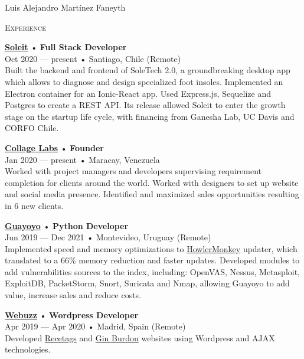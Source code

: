 \documentclass[12pt]{article}
\begin{document}
\begin{cv}{Luis Alejandro Mart\'inez Faneyth}
\begin{minipage}[t]{0.55\textwidth}
    \textrm{\textsc{\Large{Experience}}}
    \newline
    \parbox[t]{\linewidth}{
      \textbf{\href{http://soleit.app}{Soleit}} • \textrm{\textbf{Full Stack Developer}}\\
      Oct 2020 --- present • Santiago, Chile (Remote)\\
      \footnotesize{Built the backend and frontend of SoleTech 2.0, a groundbreaking desktop app which allows to diagnose and design specialized foot insoles. Implemented an Electron container for an Ionic-React app. Used Express.js, Sequelize and Postgres to create a REST API. Its release allowed Soleit to enter the growth stage on the startup life cycle, with financing from Ganesha Lab, UC Davis and CORFO Chile.}\\
    }\vspace{0.125em}
    \parbox[t]{\linewidth}{
      \textbf{\href{http://collagelabs.org}{Collage Labs}} • \textrm{\textbf{Founder}}\\
      Jan 2020 --- present • Maracay, Venezuela\\
      \footnotesize{Worked with project managers and developers supervising requirement completion for clients around the world. Worked with designers to set up website and social media presence. Identified and maximized sales opportunities resulting in 6 new clients.}\\
    }\vspace{0.125em}
    \parbox[t]{\linewidth}{
      \textbf{\href{https://guayoyo.io}{Guayoyo}} • \textrm{\textbf{Python Developer}}\\
      Jun 2019 --- Dec 2021 • Montevideo, Uruguay (Remote)\\
      \footnotesize{Implemented speed and memory optimizations to \href{https://howlermonkey.io}{HowlerMonkey} updater, which translated to a 66\% memory reduction and faster updates. Developed modules to add vulnerabilities sources to the index, including: OpenVAS, Nessus, Metasploit, ExploitDB, PacketStorm, Snort, Suricata and Nmap, allowing Guayoyo to add value, increase sales and reduce costs.}\\
    }\vspace{0.125em}
    \parbox[t]{\linewidth}{
      \textbf{\href{https://web.archive.org/web/20180413143616/https://webuzz.es/}{Webuzz}} • \textrm{\textbf{Wordpress Developer}}\\
      Apr 2019 --- Apr 2020 • Madrid, Spain (Remote)\\
      \footnotesize{Developed \href{https://web.archive.org/web/20201101021046/https://www.recetags.com/}{Recetags} and \href{https://web.archive.org/web/20191206145303/https://www.ginburdon.com/}{Gin Burdon} websites using Wordpress and AJAX technologies.}\\
}
\end{minipage}
\end{cv}
\end{document}

